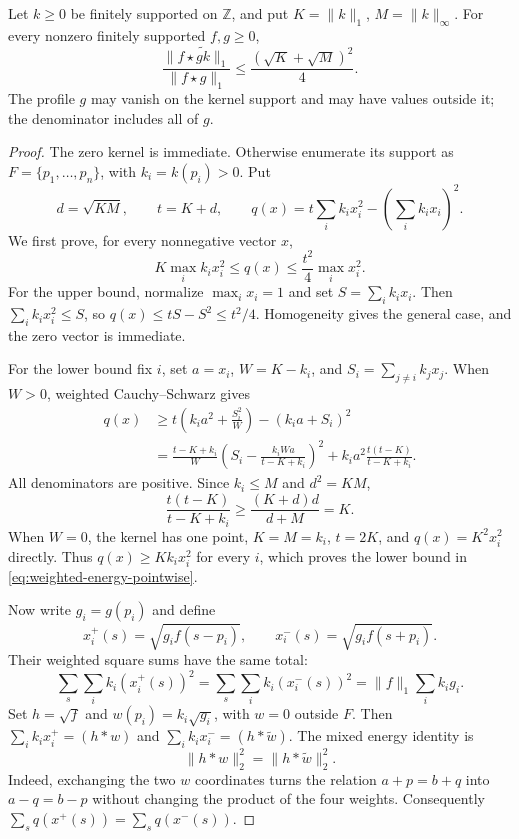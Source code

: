 \begin{theorem}\label{thm:weighted-kernel-energy}
Let $k\ge0$ be finitely supported on $\mathbb Z$, and put
$K=\|k\|_1$, $M=\|k\|_\infty$.
For every nonzero finitely supported $f,g\ge0$,
\begin{equation}\label{eq:weighted-kernel-energy}
 \frac{\|f\star\widetilde{gk}\|_1}{\|f\star g\|_1}
 \le \frac{(\sqrt K+\sqrt M)^2}{4}.
\end{equation}
The profile $g$ may vanish on the kernel support and may have values
outside it; the denominator includes all of $g$.
\end{theorem}
\begin{proof}
The zero kernel is immediate. Otherwise enumerate its support as
$F=\{p_1,\ldots,p_n\}$, with $k_i=k(p_i)>0$. Put
\[
 d=\sqrt{KM},\qquad t=K+d,\qquad
 q(x)=t\sum_i k_i x_i^2-\left(\sum_i k_i x_i\right)^2.
\]
We first prove, for every nonnegative vector $x$,
\begin{equation}\label{eq:weighted-energy-pointwise}
 K\max_i k_i x_i^2\le q(x)
       \le\frac{t^2}{4}\max_i x_i^2.
\end{equation}
For the upper bound, normalize $\max_i x_i=1$ and set
$S=\sum_i k_i x_i$. Then $\sum_i k_i x_i^2\le S$, so
$q(x)\le tS-S^2\le t^2/4$. Homogeneity gives the general case,
and the zero vector is immediate.

For the lower bound fix $i$, set $a=x_i$, $W=K-k_i$, and
$S_i=\sum_{j\ne i}k_jx_j$. When $W>0$, weighted Cauchy--Schwarz gives
\begin{align*}
 q(x)&\ge t\left(k_i a^2+\frac{S_i^2}{W}\right)-(k_i a+S_i)^2\\
 &=\frac{t-K+k_i}{W}
       \left(S_i-\frac{k_iWa}{t-K+k_i}\right)^2
       +k_i a^2\frac{t(t-K)}{t-K+k_i}.
\end{align*}
All denominators are positive. Since $k_i\le M$ and $d^2=KM$,
\[
 \frac{t(t-K)}{t-K+k_i}
 \ge\frac{(K+d)d}{d+M}=K.
\]
When $W=0$, the kernel has one point, $K=M=k_i$, $t=2K$, and
$q(x)=K^2x_i^2$ directly. Thus $q(x)\ge Kk_ix_i^2$ for every $i$,
which proves the lower bound in \eqref{eq:weighted-energy-pointwise}.

Now write $g_i=g(p_i)$ and define
\[
 x_i^+(s)=\sqrt{g_i f(s-p_i)},\qquad
 x_i^-(s)=\sqrt{g_i f(s+p_i)}.
\]
Their weighted square sums have the same total:
\[
 \sum_s\sum_i k_i(x_i^+(s))^2
 =\sum_s\sum_i k_i(x_i^-(s))^2
 =\|f\|_1\sum_i k_i g_i.
\]
Set $h=\sqrt f$ and $w(p_i)=k_i\sqrt{g_i}$, with $w=0$ outside $F$.
Then $\sum_i k_ix_i^+=(h*w)$ and
$\sum_i k_ix_i^-=(h*\widetilde w)$. The mixed energy identity is
\begin{equation}\label{eq:mixed-energy}
 \|h*w\|_2^2=\|h*\widetilde w\|_2^2.
\end{equation}
Indeed, exchanging the two $w$ coordinates turns the relation
$a+p=b+q$ into $a-q=b-p$ without changing the product of the four
weights. Consequently
$\sum_s q(x^+(s))=\sum_s q(x^-(s))$.


\end{proof}
